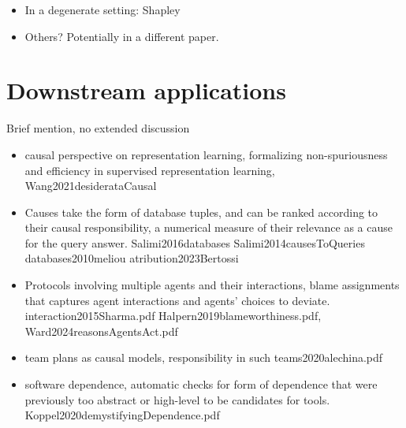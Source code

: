 \documentclass{article}
\begin{document}
\begin{itemize}

\item In a degenerate setting: Shapley 

\item Others? Potentially in a different paper.

\end{itemize}

\section{Downstream applications}

Brief mention, no extended discussion

\begin{itemize}
\item  causal perspective on representation learning, formalizing non-spuriousness and efficiency in supervised representation learning, Wang2021desiderataCausal


\item Causes take the form of database tuples, and
can be ranked according to their causal responsibility, a numerical
measure of their relevance as a cause for the query answer. Salimi2016databases Salimi2014causesToQueries databases2010meliou atribution2023Bertossi 

\item Protocols involving multiple agents and their interactions, blame assignments that captures agent interactions and agents’ choices to deviate. interaction2015Sharma.pdf Halpern2019blameworthiness.pdf, Ward2024reasonsAgentsAct.pdf

\item team plans as causal models, responsibility in such teams2020alechina.pdf

\item software dependence, automatic checks for form  of
dependence that were previously too abstract or high-level
to be candidates for tools. Koppel2020demystifyingDependence.pdf
\end{itemize}





\end{document}
